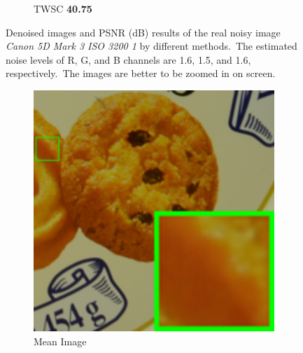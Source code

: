 \begin{figure}
\begin{subfigure}[t]{0.19\textwidth}
		\caption{TWSC \textbf{40.75}}
    \end{subfigure}
    \caption{Denoised images and PSNR (dB) results of the real noisy image \textsl{Canon 5D Mark 3 ISO 3200 1} \cite{crosschannel2016} by different methods.\ The estimated noise levels of R, G, and B channels are 1.6, 1.5, and 1.6, respectively.\ The images are better to be zoomed in on screen.}
    \label{fig3}
\end{figure}


\begin{figure}
    \centering
    \begin{subfigure}[t]{0.19\textwidth}
        \centering
        \includegraphics[width=1\textwidth]{images/twsc/cc/resize_br_Mean_d600_iso3200_2_real.png}
		\caption{Mean Image}
    \end{subfigure}
    \hfill
    \begin{subfigure}[t]{0.19\textwidth}
        \centering

\end{subfigure}
\end{figure}
